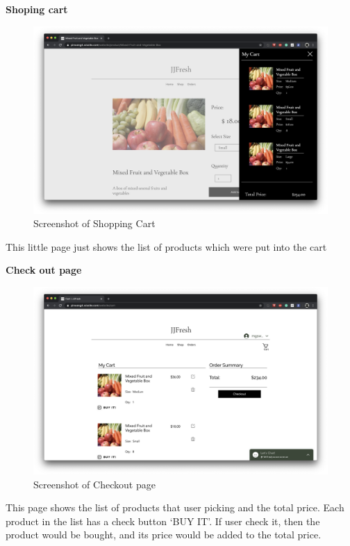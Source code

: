\clearpage
\textbf{Shoping cart}
\begin{figure}[htp]
\centering
\includegraphics[width=\textwidth]{Figures/shoppingCart.png}
\caption{Screenshot of Shopping Cart}
\label{fig:shoppingCart}
\end{figure}

This little page just shows the list of products which were put into the cart

\clearpage
\textbf{Check out page}
\begin{figure}[htp]
\centering
\includegraphics[width=\textwidth]{Figures/checkoutPage.png}
\caption{Screenshot of Checkout page}
\label{fig:checkoutPage}
\end{figure}


This page shows the list of products that user picking and the total price. Each product in the list has a check button ‘BUY IT’. If user check it, then the product would be bought, and its price would be added to the total price.

